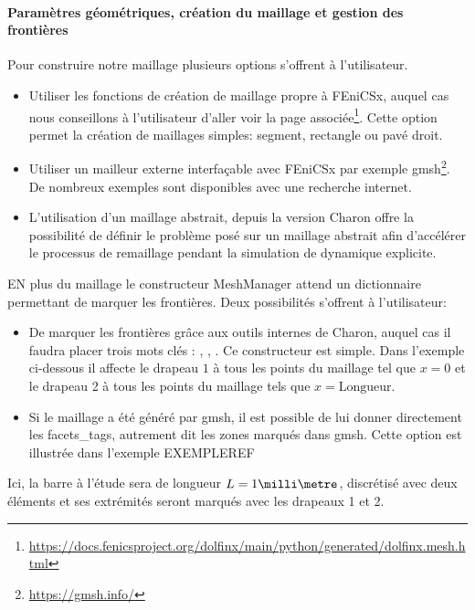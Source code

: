 \documentclass[10pt]{book}
\begin{document}
\paragraph{Paramètres géométriques, création du maillage et gestion des frontières} Pour construire notre maillage plusieurs options s'offrent à l'utilisateur. 
\begin{itemize}
\item Utiliser les fonctions de création de maillage propre à FEniCSx, auquel cas nous conseillons à l'utilisateur d'aller voir la page associée\footnote{\url{https://docs.fenicsproject.org/dolfinx/main/python/generated/dolfinx.mesh.html}}. Cette option permet la création de maillages simples: segment, rectangle ou pavé droit.
\item Utiliser un mailleur externe interfaçable avec FEniCSx par exemple gmsh\footnote{\url{https://gmsh.info/}}. De nombreux exemples sont disponibles avec une recherche internet.
\item L'utilisation d'un maillage abstrait, depuis la version Charon offre la possibilité de définir le problème posé sur un maillage abstrait afin d’accélérer le processus de remaillage pendant la simulation de dynamique explicite.
\end{itemize}
\begin{figure}[h!]

\end{figure}
EN plus du maillage le constructeur MeshManager attend un dictionnaire permettant de marquer les frontières. Deux possibilités s'offrent à l'utilisateur:
\begin{itemize}
\item De marquer les frontières grâce aux outils internes de Charon, auquel cas il faudra placer trois mots clés : , , . Ce constructeur est simple. Dans l'exemple ci-dessous il affecte le drapeau $1$ à tous les points du maillage tel que $x=0$ et le drapeau 2 à tous les points du maillage tels que $x=\text{Longueur}$.
\item Si le maillage a été généré par gmsh, il est possible de lui donner directement les facets\_tags, autrement dit les zones marqués dans gmsh. Cette option est illustrée dans l'exemple EXEMPLEREF
\end{itemize}
Ici, la barre à l'étude sera de longueur $L=1\milli\metre$, discrétisé avec deux éléments et ses extrémités seront marqués avec les drapeaux 1 et 2.
\end{document}
